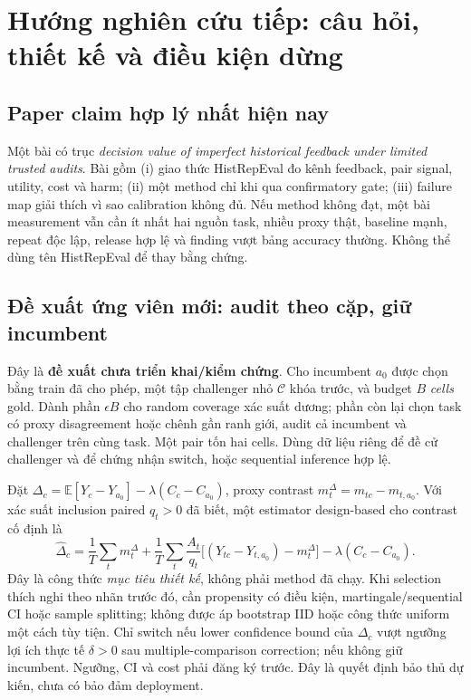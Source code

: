 \documentclass[11pt,a4paper,openany]{book}
\newcommand{\E}{\mathbb E}\newcommand{\Var}{\operatorname{Var}}\newcommand{\Cov}{\operatorname{Cov}}\newcommand{\Ind}{\mathbb I}\newcommand{\argmax}{\operatorname*{arg\,max}}\newcommand{\argmin}{\operatorname*{arg\,min}}
\begin{document}
\chapter{Hướng nghiên cứu tiếp: câu hỏi, thiết kế và điều kiện dừng}
\section{Paper claim hợp lý nhất hiện nay}
Một bài có trục \emph{decision value of imperfect historical feedback under limited trusted audits}. Bài gồm (i) giao thức HistRepEval đo kênh feedback, pair signal, utility, cost và harm; (ii) một method chỉ khi qua confirmatory gate; (iii) failure map giải thích vì sao calibration không đủ. Nếu method không đạt, một bài measurement vẫn cần ít nhất hai nguồn task, nhiều proxy thật, baseline mạnh, repeat độc lập, release hợp lệ và finding vượt bảng accuracy thường. Không thể dùng tên HistRepEval để thay bằng chứng.

\section{Đề xuất ứng viên mới: audit theo cặp, giữ incumbent}\label{sec:proposal}
Đây là \textbf{đề xuất chưa triển khai/kiểm chứng}. Cho incumbent \(a_0\) được chọn bằng train đã cho phép, một tập challenger nhỏ \(\mathcal C\) khóa trước, và budget \(B\) \emph{cells} gold. Dành phần \(\epsilon B\) cho random coverage xác suất dương; phần còn lại chọn task có proxy disagreement hoặc chênh gần ranh giới, audit cả incumbent và challenger trên cùng task. Một pair tốn hai cells. Dùng dữ liệu riêng để đề cử challenger và để chứng nhận switch, hoặc sequential inference hợp lệ.

Đặt \(\Delta_c=\E[Y_c-Y_{a_0}]-\lambda(C_c-C_{a_0})\), proxy contrast \(m_t^\Delta=m_{tc}-m_{t,a_0}\). Với xác suất inclusion paired \(q_t>0\) đã biết, một estimator design-based cho contrast cố định là
\begin{equation}\label{eq:pairedproposal}\hat\Delta_c=\frac1T\sum_t m_t^\Delta+\frac1T\sum_t\frac{A_t}{q_t}\big[(Y_{tc}-Y_{t,a_0})-m_t^\Delta\big]-\lambda(C_c-C_{a_0}).
\end{equation}
Đây là công thức \emph{mục tiêu thiết kế}, không phải method đã chạy. Khi selection thích nghi theo nhãn trước đó, cần propensity có điều kiện, martingale/sequential CI hoặc sample splitting; không được áp bootstrap IID hoặc công thức uniform một cách tùy tiện. Chỉ switch nếu lower confidence bound của \(\Delta_c\) vượt ngưỡng lợi ích thực tế \(\delta>0\) sau multiple-comparison correction; nếu không giữ incumbent. Ngưỡng, CI và cost phải đăng ký trước. Đây là quyết định bảo thủ dự kiến, chưa có bảo đảm deployment.
\end{document}
